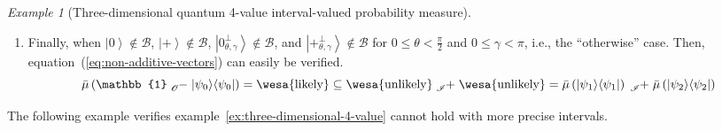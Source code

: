 \documentclass{article}
\theoremstyle{remark}
\newtheorem{example}{Example}
\newcommand{\likely}{{\mbox{\wesa{likely}}}}
\newcommand{\unlikely}{{\mbox{\wesa{unlikely}}}}
\newcommand{\ket}[1]{{\left\vert{#1}\right\rangle}}
\newcommand{\op}[2]{\ensuremath{\left\vert{#1}\middle\rangle\middle\langle{#2}\right\vert}}
\newcommand{\proj}[1]{\op{#1}{#1}}
\newcommand{\ps}{\texttt{+}}
\newcommand{\rme}{\mathrm{e}}
\newcommand{\rmi}{\mathrm{i}}
\begin{document}
\begin{example}[Three-dimensional quantum 4-value interval-valued
probability measure]
\begin{enumerate}
\begin{equation}
\begin{pmatrix}
\rme^{\rmi\left(\pi+\gamma\right)}\sin\left(\frac{\pi}{2}-\theta\right)\\
\cos\left(\frac{\pi}{2}-\theta\right)
\end{pmatrix}=\sqrt{2}\rme^{-\rmi\gamma}\ket{\ps_{\frac{\pi}{2}-\theta,\pi+\gamma}^{\perp}}\label{eq:case2-cross}
\end{equation}
Because of $0\le\theta<\frac{\pi}{2}$ and $0\le\gamma<\pi$, we have
($0<\theta'=\frac{\pi}{2}-\theta<\frac{\pi}{2}$ and $\pi\le\gamma'=\pi+\gamma<2\pi$)
or $\theta'=\frac{\pi}{2}-\theta=\frac{\pi}{2}$. Similarly, when
$\ket{\psi_{0}}$ is $\ket{\ps_{\theta,\gamma}^{\perp}}$ and $\ket{\ps}\notin\mathcal{B}$,
equation~(\ref{eq:non-additive-vectors}) holds. 
\item Finally, when $\ket{0}\notin\mathcal{B}$, $\ket{\ps}\notin\mathcal{B}$,
$\ket{0_{\theta,\gamma}^{\perp}}\notin\mathcal{B}$, and $\ket{\ps_{\theta,\gamma}^{\perp}}\notin\mathcal{B}$
for $0\le\theta<\frac{\pi}{2}$ and $0\le\gamma<\pi$, i.e., the ``otherwise''
case. Then, equation~(\ref{eq:non-additive-vectors}) can easily
be verified. 
\begin{equation}
\bar{\mu}\left(\mathbb{1}\tensor*[_{\mathscr{O}}]{-}{}\proj{\psi_{0}}\right)=\likely\subseteq\unlikely\tensor*[_{\mathscr{I}}]{+}{}\unlikely=\bar{\mu}\left(\proj{\psi_{1}}\right)\tensor*[_{\mathscr{I}}]{+}{}\bar{\mu}\left(\proj{\psi_{2}}\right)\label{eq:case3}
\end{equation}
\end{enumerate}
\end{example}

The following example verifies example~\ref{ex:three-dimensional-4-value}
cannot hold with more precise intervals.
\end{document}
